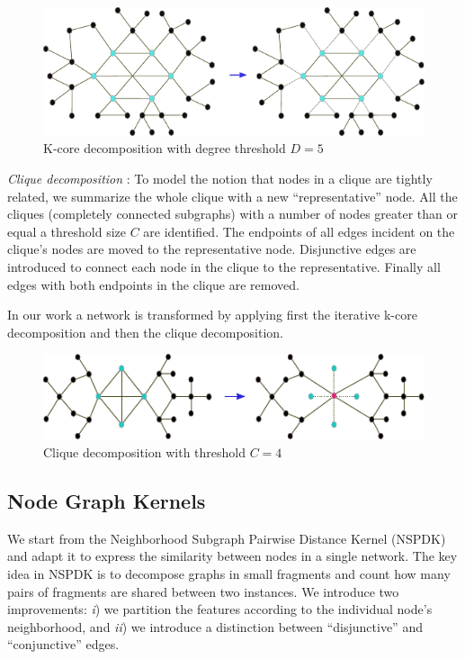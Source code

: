 \documentclass[review]{elsarticle}
\begin{document}
\begin{figure}
\centering
\includegraphics[width=.9\textwidth]{k_core}
\caption{K-core decomposition with degree threshold $D = 5$}
\label{fig:example}
\end{figure}

\textit{Clique decomposition} \cite{tarjan1985decomposition}: To model the notion that nodes in a clique are tightly related, we summarize the whole clique with a new ``representative'' node. All the cliques (completely connected subgraphs) with a number of nodes greater than or equal a threshold size $C$ are identified. The endpoints of all edges incident on the clique's nodes are moved to the representative node. Disjunctive edges are introduced to connect each node in the clique to the representative. Finally all edges with both endpoints in the clique are removed.

In our work a network is transformed by applying first the iterative k-core decomposition and then the clique decomposition.

\begin{figure}
\centering
\includegraphics[width=.9\textwidth]{clique}
\caption{Clique decomposition with threshold $C = 4$}
\label{fig:example}
\end{figure}

\subsection{Node Graph Kernels} 
We start from the Neighborhood Subgraph Pairwise Distance Kernel (NSPDK) \cite{costa2010fast} and adapt it to express the similarity between nodes in a single network. The key idea in NSPDK is to decompose graphs in small fragments and count how many pairs of fragments are shared between two instances. We introduce two improvements: \textit{i}) we partition the features according to the individual node's neighborhood, and \textit{ii}) we introduce a  distinction between ``disjunctive'' and ``conjunctive'' edges.
\end{document}
